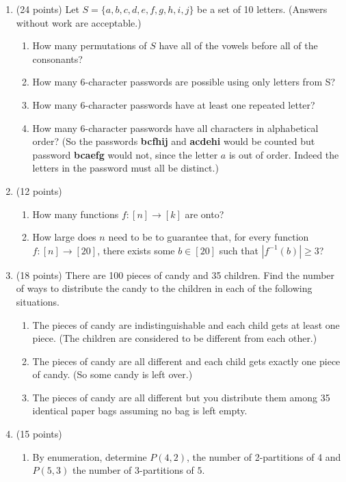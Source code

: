 \documentclass[11pt]{article}
\begin{document}
\newpage
\vspace*{-0.3in}
\begin{enumerate}
\item (24 points) Let $S=\{a,b,c,d,e,f,g,h,i,j\}$ be a set of 10 letters. (Answers without work are acceptable.)
	\begin{enumerate}
	\item How many permutations of $S$ have all of the vowels before all of the consonants?
	\vfill
	\item How many 6-character passwords are possible using only letters from S?
	\vfill
	\item How many 6-character passwords have at least one repeated letter?
	\vfill
	\item How many 6-character passwords have all characters  in alphabetical order? (So the passwords \: \textbf{bcfhij} and \textbf{acdehi} would be counted but password \: \textbf{bcaefg} would not, since the letter $a$ is out of order. Indeed the letters in the password must all be distinct.)
	\vfill
	\end{enumerate}
	

\item (12 points)
	\begin{enumerate}
	\item How many functions $f:[n] \to [k]$ are onto?
	\vfill
	\item How large does $n$ need to be to guarantee that, for every function $f:[n] \to [20]$, there exists some $b \in [20]$ such that $|f^{-1}(b)| \geq 3$?
	\vfill 
	\end{enumerate}
\newpage
\item (18 points) There are 100 pieces of candy and 35 children. Find the number of ways to distribute the candy to the children in each of the following situations.
	\begin{enumerate}
	\item The pieces of candy are indistinguishable and each child gets at least one piece. (The children are considered to be different from each other.)
	\vfill
	\item The pieces of candy are all different and each child gets exactly one piece of candy. (So some candy is left over.)
	\vfill
	\item The pieces of candy are all different but you distribute them among 35 identical paper bags assuming no bag is left empty.
	\vfill
	\end{enumerate}
\item (15 points)
	\begin{enumerate}
	\item By enumeration, determine $P(4,2)$, the number of 2-partitions of 4 and $P(5,3)$ the number of $3$-partitions of $5.$ \\
	\vfill


\end{enumerate}
\end{enumerate}
\end{document}
